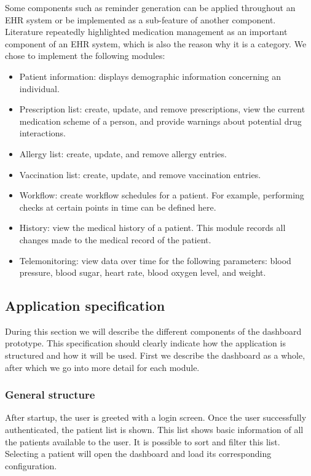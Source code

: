         \noindent Some components such as reminder generation can be applied throughout an EHR system or be implemented as a sub-feature of another component. Literature repeatedly highlighted medication management as an important component of an EHR system, which is also the reason why it is a category. We chose to implement the following modules:
        \begin{itemize}
            \item Patient information: displays demographic information concerning an individual.
            \item Prescription list: create, update, and remove prescriptions, view the current medication scheme of a person, and provide warnings about potential drug interactions.
            \item Allergy list: create, update, and remove allergy entries.
            \item Vaccination list: create, update, and remove vaccination entries.
            \item Workflow: create workflow schedules for a patient. For example, performing checks at certain points in time can be defined here.
            \item History: view the medical history of a patient. This module records all changes made to the medical record of the patient.
            \item Telemonitoring: view data over time for the following parameters: blood pressure, blood sugar, heart rate, blood oxygen level, and weight.
        \end{itemize}

    \subsection{Application specification}\label{app_specification}

    During this section we will describe the different components of the dashboard prototype. This specification should clearly indicate how the application is structured and how it will be used. First we describe the dashboard as a whole, after which we go into more detail for each module.

        \subsubsection{General structure}

        After startup, the user is greeted with a login screen. Once the user successfully authenticated, the patient list is shown. This list shows basic information of all the patients available to the user. It is possible to sort and filter this list. Selecting a patient will open the dashboard and load its corresponding configuration.

